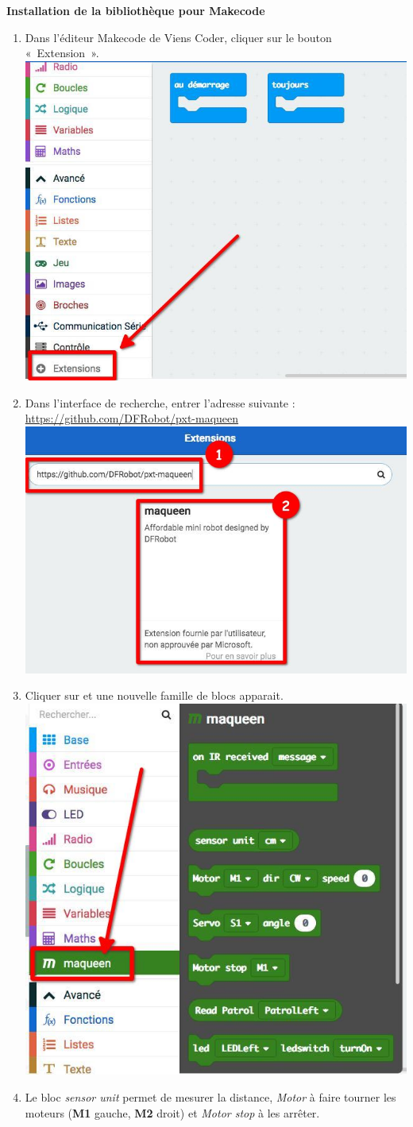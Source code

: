 \begin{methode}
\textbf{Installation de la bibliothèque \mq pour Makecode}


    
\begin{enumerate}
    \item Dans l’éditeur Makecode de Viens Coder, cliquer sur le bouton « Extension ».\\
    \includegraphics[width=0.5\linewidth]
    {res/maqueen-fiche1-02.jpg}
    
    \item Dans l’interface de recherche, entrer l’adresse suivante : \url{https://github.com/DFRobot/pxt-maqueen}\\
    \includegraphics[width=0.5\linewidth]
    {res/maqueen-fiche1-03.jpg}
    
    \item Cliquer sur \textit{\mq} et une nouvelle famille de blocs apparait.\\
    \includegraphics[width=0.5\linewidth]
    {res/maqueen-fiche1-04.jpg}
    
    \item Le bloc \textit{sensor unit} permet de mesurer la distance, \textit{Motor} à faire tourner les moteurs (\textbf{M1} gauche, \textbf{M2} droit) et \textit{Motor stop} à les arrêter.
\end{enumerate}
\end{methode}



